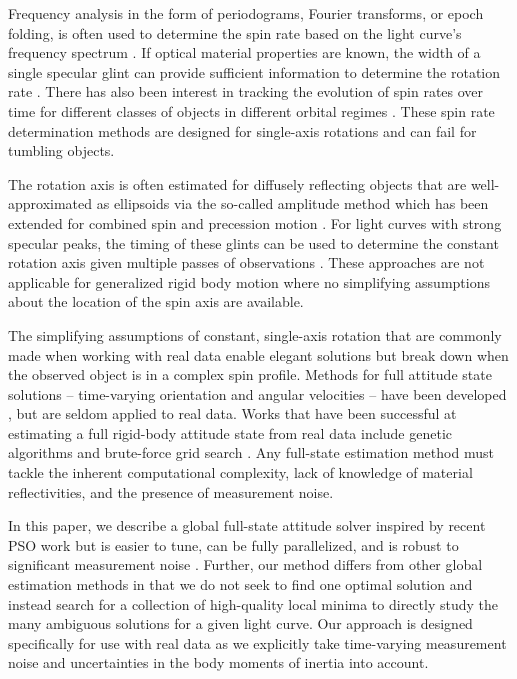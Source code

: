 \documentclass[a4paper,twocolumn]{spaceDebrisC} %
\begin{document}
Frequency analysis in the form of periodograms, Fourier transforms, or epoch folding, is often used to determine the spin rate based on the light curve's frequency spectrum \cite{silha2015, silha2021, isoletta2024, schildknecht2015, pittet2017, yanagisawa2012, koshkin2018}. If optical material properties are known, the width of a single specular glint can provide sufficient information to determine the rotation rate \cite{hinks2016}. There has also been interest in tracking the evolution of spin rates over time for different classes of objects in different orbital regimes \cite{koshkin2018, blacketer2022, karpov2016}. These spin rate determination methods are designed for single-axis rotations and can fail for tumbling objects.

The rotation axis is often estimated for diffusely reflecting objects that are well-approximated as ellipsoids via the so-called amplitude method \cite{williams1979location} which has been extended for combined spin and precession motion \cite{yanagisawa2012}. For light curves with strong specular peaks, the timing of these glints can be used to determine the constant rotation axis given multiple passes of observations \cite{vananti2023, koshkin2018}. These approaches are not applicable for generalized rigid body motion where no simplifying assumptions about the location of the spin axis are available.

The simplifying assumptions of constant, single-axis rotation that are commonly made when working with real data enable elegant solutions but break down when the observed object is in a complex spin profile. Methods for full attitude state solutions -- time-varying orientation and angular velocities -- have been developed \cite{clark2022, burton2024journal, gagnon2024, linares2014particle}, but are seldom applied to real data. Works that have been successful at estimating a full rigid-body attitude state from real data include genetic algorithms \cite{piergentili2020, gallucci2020} and brute-force grid search \cite{shafer2017}. Any full-state estimation method must tackle the inherent computational complexity, lack of knowledge of material reflectivities, and the presence of measurement noise.

In this paper, we describe a global full-state attitude solver inspired by recent PSO work \cite{burton2024journal} but is easier to tune, can be fully parallelized, and is robust to significant measurement noise \cite{robinson2025att}. Further, our method differs from other global estimation methods in that we do not seek to find one optimal solution and instead search for a collection of high-quality local minima to directly study the many ambiguous solutions for a given light curve. Our approach is designed specifically for use with real data as we explicitly take time-varying measurement noise and uncertainties in the body moments of inertia into account. 
\end{document}
